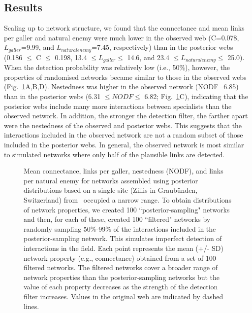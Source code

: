 \documentclass[12pt]{article}
\begin{document}
  \subsection*{Results}

      Scaling up to network structure, we found that the connectance and mean links per galler and natural enemy were much lower in the observed web (C=0.078, $L_{galler}$=9.99, and $L_{natural enemy}$=7.45, respectively) than in the posterior webs (0.186 $\leq$ C $\leq$ 0.198, 13.4 $\leq L_{galler} \leq$ 14.6, and 23.4 $\leq L_{natural enemy} \leq$ 25.0). When the detection probability was relatively low (i.e., 50\%), however, the properties of randomised networks became similar to those in the observed webs (Fig.~\ref{posterior_webs}A,B,D). Nestedness was higher in the observed network (NODF=6.85) than in the posterior webs (6.31 $\leq NODF \leq$ 6.82; Fig.~\ref{posterior_webs}C), indicating that the posterior webs include many more interactions between specialists than the observed network. In addition, the stronger the detection filter, the farther apart were the nestedness of the observed and posterior webs. This suggests that the interactions included in the observed network are not a random subset of those included in the posterior webs. In general, the observed network is most similar to simulated networks where only half of the plausible links are detected. 



  \begin{figure}[h!]
    \caption{Mean connectance, links per galler, nestedness (NODF), and links per natural enemy for networks assembled using posterior distributions based on a single site (Zillis in Graub\"{u}nden, Switzerland) from~\citet{Kopelke2017} occupied a narrow range. To obtain distributions of network properties, we created 100 ``posterior-sampling" networks and then, for each of these, created 100 ``filtered" networks by randomly sampling 50\%-99\% of the interactions included in the posterior-sampling network. This simulates imperfect detection of interactions in the field. Each point represents the mean (+/- SD) network property (e.g., connectance) obtained from a set of 100 filtered networks. The filtered networks cover a broader range of network properties than the posterior-sampling networks but the value of each property decreases as the strength of the detection filter increases. Values in the original web are indicated by dashed lines.}
    \label{posterior_webs}    
    \begin{center}
    \end{center}
    \end{figure}
\end{document}

